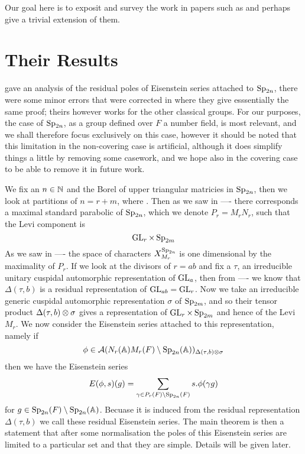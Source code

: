 Our goal here is to exposit and survey the work in papers such as \cite{brennerNotesAnalyticProperties2009}\cite{jiangPolesCertainResidual2013}\cite{ginzburgTopFourierCoefficients2021} and perhaps give a trivial extension of them.


\section{Their Results}
\cite{brennerNotesAnalyticProperties2009} gave an analysis of the residual poles of Eisenstein series attached to \(\operatorname{Sp}_{2n}\), there were some minor errors that were corrected in \cite{jiangPolesCertainResidual2013} where they give esssentially the same proof; theirs however works for the other classical groups. For our purposes, the case of \(\operatorname{Sp}_{2n}\), as a group defined over \(F\) a number field, is most relevant, and we shall therefore focus exclusively on this case, however it should be noted that this limitation in the non-covering case is artificial, although it does simplify things a little by removing some casework, and we hope also in the covering case to be able to remove it in future work. 

We fix an \(n\in \N\) and the Borel of upper triangular matricies in \(\operatorname{Sp}_{2n} \), then we look at partitions of \(n = r + m\), where . Then as we saw in  ---- there corresponds a maximal standard parabolic of \(\operatorname{Sp}_{2n}\), which we denote \(P_r = M_rN_r\), such that the Levi component is 
\[\operatorname{GL}_r\times \operatorname{Sp}_{2m} \]
As we saw in ---- the space of characters \(X^{\operatorname{Sp}_{2n}}_{M_r}\) is one dimensional by the maximality of \(P_r\). If we look at the divisors of \(r = ab\)  and fix a \(\tau\), an irreducible unitary cuspidal automorphic representation of \(\operatorname{GL}_a\), then from  ---- we know that \(\Delta(\tau, b)\) is a residual representation of \(\operatorname{GL}_{ab} = \operatorname{GL}_r\). Now we take an irreducible generic cuspidal automorphic representation \(\sigma\) of \(\operatorname{Sp}_{2m}\), and so their tensor product \(\Delta(\tau, b) \otimes \sigma\) gives a representation of \(\operatorname{GL}_{r}\times \operatorname{Sp}_{2m}\) and hence of the Levi \(M_r\). We now consider the Eisenstein series attached to this representation, namely if 
\[\phi\in \mathcal{A}(N_r(\A)M_r(F)\setminus \Sp_{2n}(\A) )_{\Delta(\tau, b)\tensor \sigma}\] 
then we have the Eisenstein series
\[E(\phi, s)(g) = \sum_{\gamma\in P_r(F) \setminus \Sp_{2n}(F)} s.\phi(\gamma g)\]
for \(g\in \Sp_{2n}(F) \setminus \Sp_{2n}(\A)\). Becuase it is induced from the residual representation \(\Delta(\tau, b)\) we call these residual Eisenstein series. The main theorem is then a statement that after some normalisation the poles of this Eisenstein series are limited to a particular set and that they are simple. Details will be given later.


